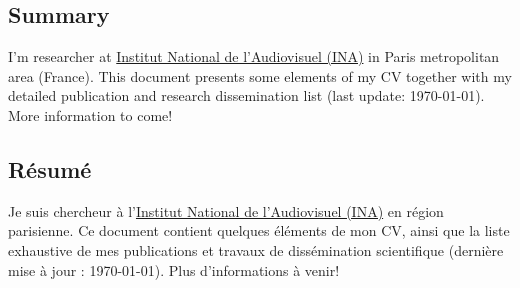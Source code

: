 

\begin{en}
\section*{Summary}

I'm researcher at \href{https://www.ina.fr}{Institut National de l'Audiovisuel (INA)} in Paris metropolitan area (France).
This document presents some elements of my CV together with my detailed publication and research dissemination list (last update: \today).
More information to come!
\end{en}

\begin{fr}
\section*{Résumé}

Je suis chercheur à l'\href{https://www.ina.fr}{Institut National de l'Audiovisuel (INA)} en région parisienne.
Ce document contient quelques éléments de mon CV, ainsi que la liste exhaustive de mes publications et travaux de dissémination scientifique (dernière mise à jour : \today).
Plus d'informations à venir!
\end{fr}



\tableofcontents

